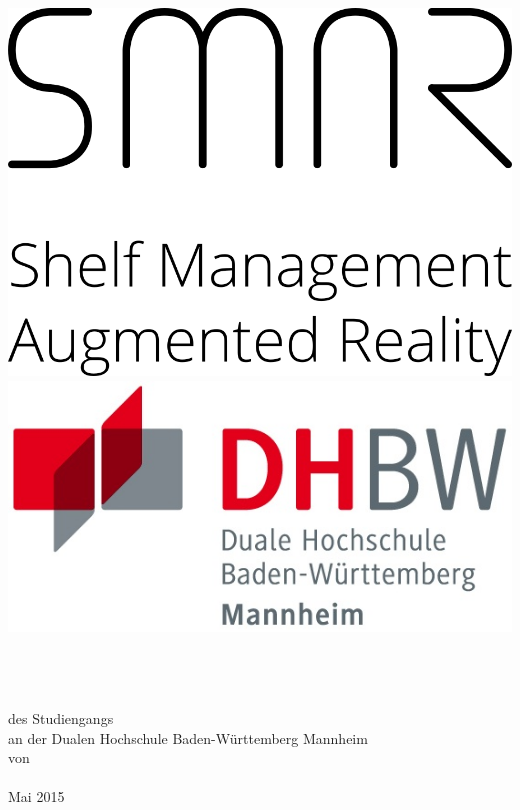 \thispagestyle{plain}
\begin{titlepage}
\enlargethispage{6.0cm}
\rmfamily 								%
				


			
				

\includegraphics[scale=1.5]{Bilder/logo_smar.png} 
\hfill
\includegraphics[scale=1.0]{Bilder/logo_dhbw_ma.jpg}\\[5ex] %


\begin{center}

\huge{\textbf{\titel}}\\[1.5ex]
\Large{\textbf{\untertitel}}\\[5ex]
\LARGE{\arbeit}\\[2ex]
\normalsize{des Studiengangs \studiengang~}\\[1ex]
\normalsize{an der Dualen Hochschule Baden-Württemberg Mannheim}\\[1ex]
von\\[1ex] 
\Large{\autor} \\[4ex] %
\normalsize{Mai 2015} \\[16ex]


\end{center}
\end{titlepage}
